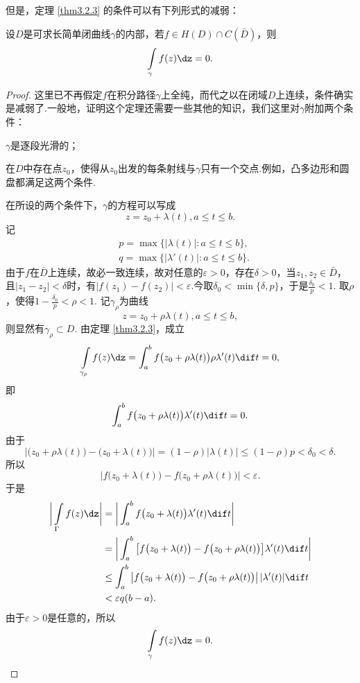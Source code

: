 但是，定理 \ref{thm3.2.3} 的条件可以有下列形式的减弱：
\begin{theorem}\label{thm3.2.4}
设$D$是可求长简单闭曲线$\gamma$的内部，若$f\in H(D)\cap C(\bar D)$，则
\[\int\limits_\gamma f(z)\dz=0.\]
\end{theorem}
\begin{proof}
这里已不再假定$f$在积分路径$\gamma$上全纯，而代之以在闭域$D$上连续，条件确实是减弱了.一般地，证明这个定理还需要一些其他的知识，我们这里对$\gamma$附加两个条件：
\begin{eenum}
\item $\gamma$是逐段光滑的；
\item 在$D$中存在点$z_0$，使得从$z_0$出发的每条射线与$\gamma$只有一个交点.例如，凸多边形和圆盘都满足这两个条件.
\end{eenum}

在所设的两个条件下，$\gamma$的方程可以写成
\[z=z_0+\lambda(t),a\le t\le b.\]
记
\begin{align*}
&p=\max\{|\lambda(t)|:a\le t\le b\},\\
&q=\max\{|\lambda'(t)|:a\le t\le b\}.
\end{align*}
由于$f$在$\bar D$上连续，故必一致连续，故对任意的$\varepsilon>0$，存在$\delta>0$，当$z_1,z_2\in\bar D$，且$|z_1-z_2|<\delta$时，有$|f(z_1)-f(z_2)|<\varepsilon$.今取$\delta_0<\min\{\delta,p\}$，于是$\frac{\delta_0}p<1$. 取$\rho$，使得$1-\frac{\delta_0}p<\rho<1$. 记$\gamma_\rho$为曲线
\[z=z_0+\rho\lambda(t),a\le t\le b,\]
则显然有$\gamma_\rho\subset D$. 由定理 \ref{thm3.2.3}，成立
\[\int\limits_{\gamma_\rho}f(z)\dz=\int_a^bf\big(z_0+\rho\lambda(t)\big)
\rho\lambda'(t)\dif t=0,\]
即
\[\int_a^bf\big(z_0+\rho\lambda(t)\big)\lambda'(t)\dif t=0.\]
由于
\[\big|\big(z_0+\rho\lambda(t)\big)-\big(z_0+\lambda(t)\big)\big|
  = (1-\rho)|\lambda(t)|\le(1-\rho)p<\delta_0<\delta.\]
所以
\[\big|f\big(z_0+\lambda(t)\big)-f\big(z_0+\rho\lambda(t)\big)\big|<\varepsilon.\]
于是
\begin{align*}
\bigg|\int\limits_\Gamma f(z)\dz\bigg|
& = \bigg|\int_a^bf\big(z_0+\lambda(t)\big)\lambda'(t)\dif t\bigg| \\
& = \bigg|\int_a^b\big[f\big(z_0+\lambda(t)\big)-f\big(z_0+\rho\lambda(t)\big)\big]
    \lambda'(t)\dif t\bigg| \\
& \le \int_a^b\big|f\big(z_0+\lambda(t)\big)-f\big(z_0+
\rho\lambda(t)\big)\big|\,|\lambda'(t)|\dif t \\
& < \varepsilon q(b-a).
\end{align*}
由于$\varepsilon>0$是任意的，所以
\begin{equation*}
  \int\limits_\gamma f(z)\dz=0. \qedhere
\end{equation*}
\end{proof}

